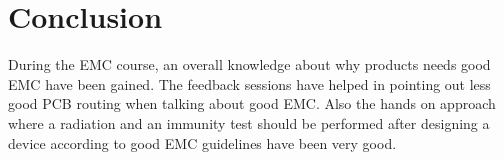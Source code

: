 \chapter{Conclusion}
During the EMC course, an overall knowledge about why products needs good EMC have been gained. The feedback sessions have helped in pointing out less good PCB routing when talking about good EMC. Also the hands on approach where a radiation and an immunity test should be performed after designing a device according to good EMC guidelines have been very good. 